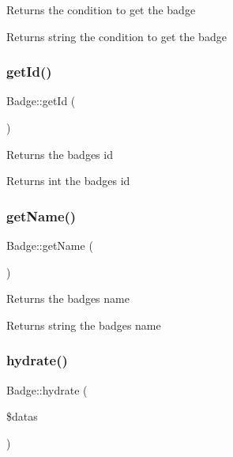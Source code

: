 Returns the condition to get the badge \begin{DoxyReturn}{Returns}
string the condition to get the badge 
\end{DoxyReturn}
\mbox{\label{classBadge_a206349087c7b423daa4964318886ccc3}} 
\subsubsection{\texorpdfstring{get\+Id()}{getId()}}
{\footnotesize\ttfamily Badge\+::get\+Id (\begin{DoxyParamCaption}{ }\end{DoxyParamCaption})}

Returns the badge\textquotesingle{}s id \begin{DoxyReturn}{Returns}
int the badge\textquotesingle{}s id 
\end{DoxyReturn}
\mbox{\label{classBadge_a08e0c102d48aed880562403af8303709}} 
\subsubsection{\texorpdfstring{get\+Name()}{getName()}}
{\footnotesize\ttfamily Badge\+::get\+Name (\begin{DoxyParamCaption}{ }\end{DoxyParamCaption})}

Returns the badge\textquotesingle{}s name \begin{DoxyReturn}{Returns}
string the badge\textquotesingle{}s name 
\end{DoxyReturn}
\mbox{\label{classBadge_a3b8f16049d6e5d50ae21276421a41508}} 
\subsubsection{\texorpdfstring{hydrate()}{hydrate()}}
{\footnotesize\ttfamily Badge\+::hydrate (\begin{DoxyParamCaption}\item[{}]{\$datas }\end{DoxyParamCaption})\hspace{0.3cm}{\ttfamily [protected]}}


